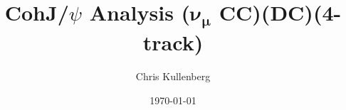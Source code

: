 \title{CohJ/$\psi$ Analysis ($\boldsymbol{\nu_\mu}$ \textbf{CC})(\textbf{DC})(\textbf{4-track})}
\author{Chris Kullenberg}
\date{\today}
